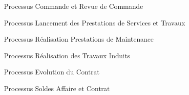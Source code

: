 \begin{figure}[H]
    \label{fig-commande-revue-commande}
    \noindent{}
    \caption{Processus Commande et Revue de Commande}
\end{figure}

\begin{figure}[H]
    \label{fig-lancement-prest}
    \noindent{}
    \caption{Processus Lancement des Prestations de Services et Travaux}
\end{figure}

\begin{figure}[H]
    \label{fig-realisation-prest}
    \noindent{}
    \caption{Processus Réalisation Prestations de Maintenance}
\end{figure}

\begin{figure}[H]
    \label{fig-travaux-induits}
    \noindent{}
    \caption{Processus Réalisation des Travaux Induits}
\end{figure}

\begin{figure}[H]
    \label{fig-evolution-contrat}
    \noindent{}
    \caption{Processus Evolution du Contrat}
\end{figure}

\begin{figure}[H]
    \label{fig-soldes-affaire}
    \noindent{}
    \caption{Processus Soldes Affaire et Contrat}
\end{figure}


